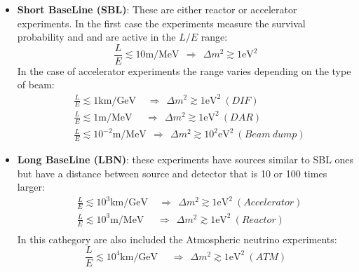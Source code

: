 \documentclass[12pt,a4paper,openright,twoside]{report}
\begin{document}
\begin{itemize}
	\item \textbf{Short BaseLine (SBL)}: These are either reactor or accelerator experiments. In the first case the experiments measure the survival probability and and are active in the $L/E$ range:
	\begin{equation}
	\frac{L}{E}\lesssim 10 \text{m/MeV} \ \ \Longrightarrow \ \ \Delta m^2 \gtrsim 1\text{eV}^2
	\end{equation}
	In the case of  accelerator experiments the range varies depending on the type of beam:
	\begin{equation}
	\begin{split}
	&\frac{L}{E}\lesssim 1 \text{km/GeV} \ \ \ \ \  \Longrightarrow \ \ \Delta m^2 \gtrsim 1\text{eV}^2 \ (DIF)\\ 
	 &\frac{L}{E}\lesssim 1 \text{m/MeV} \ \ \ \ \ \  \Longrightarrow \ \ \Delta m^2 \gtrsim 1\text{eV}^2  \ (DAR)\\
	 &\frac{L}{E}\lesssim 10^{-2} \text{m/MeV} \ \  \Longrightarrow \ \ \Delta m^2  \gtrsim 10^2\text{eV}^2\ (Beam \ dump)
	\end{split}
	\end{equation}
	
	\item \textbf{Long BaseLine (LBN)}: these experiments have sources similar to SBL ones but have a distance between source and detector that is 10 or 100 times larger:
	\begin{equation}
	\begin{split}
	&\frac{L}{E}\lesssim 10^3 \text{km/GeV} \ \ \ \ \  \Longrightarrow \ \ \Delta m^2 \gtrsim 1\text{eV}^2 \ (Accelerator)\\ 
	&\frac{L}{E}\lesssim 10^3 \text{m/MeV} \ \ \ \ \ \  \Longrightarrow \ \ \Delta m^2 \gtrsim 1\text{eV}^2  \ (Reactor)\\
	\end{split}
	\end{equation}
	In this cathegory are also included the Atmospheric neutrino experiments:
	\begin{equation}
	\frac{L}{E}\lesssim 10^4 \text{km/GeV} \ \ \ \ \ \  \Longrightarrow \ \ \Delta m^2 \gtrsim 1\text{eV}^2  \ (ATM)
	\end{equation}
	

\end{itemize}
\end{document}
